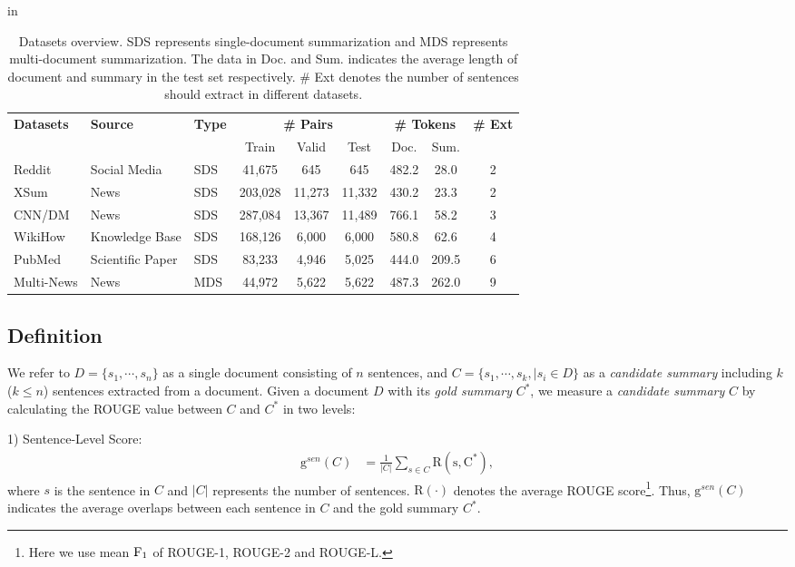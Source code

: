 \renewcommand\arraystretch{1.1}
\begin{table*}[t]
    \center \footnotesize
     in
    \begin{tabular}{lllcccccc}
    \toprule
    \multicolumn{1}{l}{\multirow{2}[1]{*}{\textbf{Datasets}}} &
    \multicolumn{1}{l}{\multirow{2}[1]{*}{\textbf{Source}}} &
    \multicolumn{1}{c}{\multirow{2}[1]{*}{\textbf{Type}}} & \multicolumn{3}{c}{\textbf{\# Pairs}} &
    \multicolumn{2}{c}{\textbf{\# Tokens}} &
    \multicolumn{1}{l}{\multirow{2}[1]{*}{\textbf{\# Ext}}} \\
     & & & Train & Valid & Test & Doc. & Sum. & \\
    \midrule
    Reddit &  Social Media & SDS & 41,675 & 645 & 645 &  482.2 & 28.0 & 2\\
    XSum  &  News  & SDS & 203,028 & 11,273 & 11,332 & 430.2 & 23.3 & 2\\
    CNN/DM &  News  & SDS & 287,084 & 13,367 & 11,489 & 766.1 & 58.2 & 3 \\
    WikiHow & Knowledge Base & SDS &  168,126 & 6,000 & 6,000 & 580.8 & 62.6 & 4\\
    PubMed &  Scientific Paper & SDS & 83,233 & 4,946 & 5,025 & 444.0 & 209.5 & 6\\
    Multi-News &  News  & MDS & 44,972 & 5,622 & 5,622 & 487.3 & 262.0 & 9\\
    \bottomrule
    \end{tabular}%
    \caption{Datasets overview. SDS represents single-document summarization and MDS represents multi-document summarization. The data in Doc. and Sum. indicates the average length of document and summary in the test set respectively. \# Ext denotes the number of sentences should extract in different datasets.}
  \label{tab:datasets}%
\end{table*}%

\subsection{Definition}
We refer to $D = \{s_1,\cdots,s_n\}$ as a single document consisting of $n$ sentences, and $C = \{s_1,\cdots,s_k, | s_i \in D\}$ as a \textit{candidate summary} including $k$ ($k \leq n$) sentences extracted from a document.
Given a document $D$ with its \textit{gold summary} $C^*$, we measure a \textit{candidate summary}  $C$  by calculating the ROUGE \cite{lin2003automatic} value between $C$  and $C^*$ in two levels:

1) Sentence-Level Score:
\begin{align}
    \mathrm{g}^{sen}(C) &= \frac{1}{|C|}\sum_{s \in C}\mathrm{R(s, C^*)} \label{eq:g_sen},
\end{align}
where $s$ is the sentence in $C$ and $|C|$ represents the number of sentences. $\mathrm{R}(\cdot)$ denotes the average ROUGE score\footnote{Here we use mean $\rm F_1$ of ROUGE-1, ROUGE-2 and ROUGE-L.}.
Thus, $\mathrm{g}^{sen}(C)$ indicates the average overlaps between each sentence in $C$ and the gold summary $C^*$.

